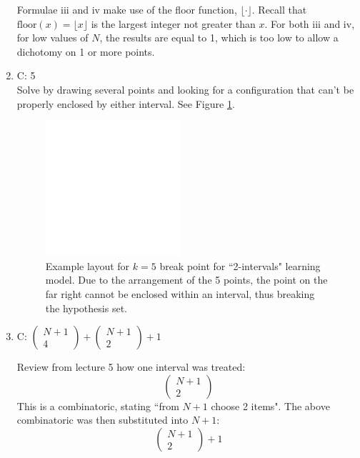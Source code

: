 \documentclass[11pt]{article}
\theoremstyle{definition}
\begin{document}
\begin{enumerate}
Formulae iii and iv make use of the floor function, $\lfloor \cdot \rfloor$. Recall that $\text{floor}(x) = \lfloor x \rfloor$ is the largest integer not greater than $x$. For both iii and iv, for low values of $N$, the results are equal to 1, which is too low to allow a dichotomy on 1 or more points.

\item C: 5\\
Solve by drawing several points and looking for a configuration that can't be properly enclosed by either interval. See Figure \ref{breakpoint2intervals}.
	\begin{figure}[ht!]
	\centering
	\includegraphics[width=50mm]{hw03q06.pdf}
	\caption{Example layout for $k=5$ break point for ``2-intervals" learning model. Due to the arrangement of the 5 points, the point on the far right cannot be enclosed within an interval, thus breaking the hypothesis set.}
	\label{breakpoint2intervals}
	\end{figure}

\item C: \(\left( 
\begin{array}{c} N+1\\ 4 \end{array}\right) + \left( \begin{array}{c} N+1\\ 2 \end{array}\right) + 1\)

Review from lecture 5 how one interval was treated: \[\left( \begin{array}{c}N+1\\2 \end{array}\right)\]
This is a combinatoric, stating ``from $N+1$ choose 2 items". The above combinatoric was then substituted into $N+1$:
\[ \left( \begin{array}{c} N+1\\ 2 \end{array}\right) + 1\]


\end{enumerate}
\end{document}
